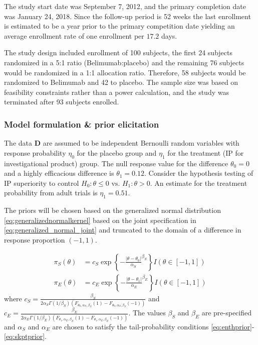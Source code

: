 \documentclass[12pt]{article}
\begin{document}
The study start date was September 7, 2012, and the primary completion date was January 24, 2018. Since the follow-up period is 52 weeks the last enrollment is estimated to be a year prior to the primary competition date yielding an average enrollment rate of one enrollment per $17.2$ days.

The study design included enrollment of 100 subjects, the first 24 subjects randomized in a 5:1 ratio (Belimumab:placebo) and the remaining 76 subjects would be randomized in a 1:1 allocation ratio. Therefore, 58 subjects would be randomized to Belimumab and 42 to placebo. The sample size was based on feasibility constraints rather than a power calculation, and the study was terminated after 93 subjects enrolled.

\subsubsection{Model formulation \& prior elicitation}\label{sec:example2model}
The data $\mathbf{D}$ are assumed to be independent Bernoulli random variables with response probability $\eta_0$ for the placebo group and $\eta_1$ for the treatment (IP for investigational product) group. The null response value for the difference $\theta_0=0$ and a highly efficacious difference is $\theta_1=0.12$. Consider the hypothesis testing of IP superiority to control $H_0:\theta\leq 0\text{ vs. }H_1: \theta>0$. An estimate for the treatment probability from adult trials is $\eta_1=0.51$.

The priors will be chosen based on the generalized normal distribution \eqref{eq:generalizednormalkernel} based on the joint specification in \eqref{eq:generalized_normal_joint} and truncated to the domain of a difference in response proportion $(-1, 1)$.

\begin{align*}
\pi_S(\theta)&=c_S \exp\left\{-\frac{|\theta-\theta_0|}{\alpha_S}^{\beta_S}\right\}{I(\theta\in[-1,1])}\\
\pi_E(\theta)&=c_E\exp\left\{-\frac{|\theta-\theta_1|}{\alpha_E}^{\beta_E}\right\}{I(\theta\in[-1,1])}
\end{align*}
where $c_S=\frac{\beta_S}{2\alpha_S \Gamma(1/\beta_S)({F_{\theta_0,\alpha_S,\beta_S}(1)-F_{\theta_0,\alpha_S,\beta_S}(-1)})}$ and $c_E=\frac{\beta_E}{2\alpha_E \Gamma(1/\beta_E)({F_{\theta_1,\alpha_E,\beta_E}(1)-F_{\theta_1,\alpha_E,\beta_E}(-1)})}$. The values $\beta_S$ and $\beta_E$ are pre-specified and $\alpha_S$ and $\alpha_E$ are chosen to satisfy the tail-probability conditions 
\eqref{eq:enthprior}-\eqref{eq:skptprior}.
\end{document}
